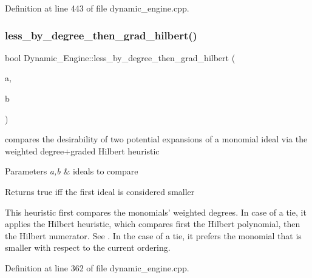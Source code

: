 Definition at line 443 of file dynamic\+\_\+engine.\+cpp.

\mbox{\label{namespace_dynamic___engine_ab5f217efe789e73d511ab04ae93942f1}} 
\subsubsection{\texorpdfstring{less\+\_\+by\+\_\+degree\+\_\+then\+\_\+grad\+\_\+hilbert()}{less\_by\_degree\_then\_grad\_hilbert()}}
{\footnotesize\ttfamily bool Dynamic\+\_\+\+Engine\+::less\+\_\+by\+\_\+degree\+\_\+then\+\_\+grad\+\_\+hilbert (\begin{DoxyParamCaption}\item[{\hyperlink{group___g_b_computation_class_dynamic___engine_1_1_p_p___with___ideal}{P\+P\+\_\+\+With\+\_\+\+Ideal} \&}]{a,  }\item[{\hyperlink{group___g_b_computation_class_dynamic___engine_1_1_p_p___with___ideal}{P\+P\+\_\+\+With\+\_\+\+Ideal} \&}]{b }\end{DoxyParamCaption})}



compares the desirability of two potential expansions of a monomial ideal via the weighted degree+graded Hilbert heuristic 


\begin{DoxyParams}{Parameters}
{\em a,b} & ideals to compare \\
\hline
\end{DoxyParams}
\begin{DoxyReturn}{Returns}
{\ttfamily true} iff the first ideal is considered smaller
\end{DoxyReturn}
This heuristic first compares the monomials' weighted degrees. In case of a tie, it applies the Hilbert heuristic, which compares first the Hilbert polynomial, then the Hilbert numerator. See \cite{CaboaraDynAlg}. In the case of a tie, it prefers the monomial that is smaller with respect to the current ordering. 

Definition at line 362 of file dynamic\+\_\+engine.\+cpp.

\mbox{\label{namespace_dynamic___engine_ae94f12023f4a0c1bf246afc31cd0538e}} 
